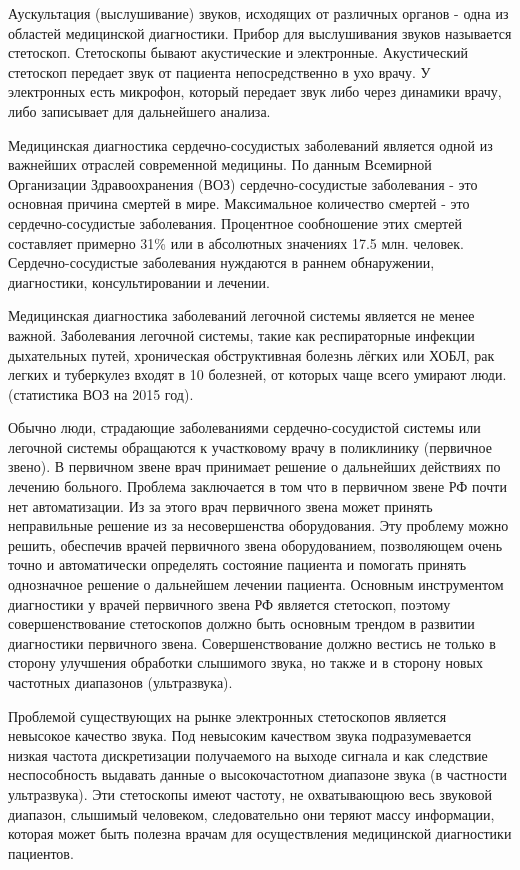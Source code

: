 \documentclass[../paper.tex]{subfiles}
\begin{document}
Аускультация (выслушивание) звуков, исходящих от различных органов - одна из областей медицинской диагностики. Прибор для выслушивания звуков называется стетоскоп. Стетоскопы бывают акустические и электронные. Акустический стетоскоп передает звук от пациента непосредственно в ухо врачу. У электронных есть микрофон, который передает звук либо через динамики врачу, либо записывает для дальнейшего анализа.

Медицинская диагностика сердечно-сосудистых заболеваний является одной из важнейших отраслей современной медицины. По данным Всемирной Организации Здравоохранения (ВОЗ) сердечно-сосудистые заболевания - это основная причина смертей в мире. Максимальное количество смертей - это сердечно-сосудистые заболевания. Процентное сообношение этих смертей составляет примерно 31\% или в абсолютных значениях  17.5 млн. человек. Сердечно-сосудистые заболевания нуждаются в раннем обнаружении, диагностики, консультировании и лечении.

Медицинская диагностика заболеваний легочной системы является не менее важной. Заболевания легочной системы, такие как респираторные инфекции дыхательных путей, хроническая обструктивная болезнь лёгких или ХОБЛ, рак легких и туберкулез входят в 10 болезней, от которых чаще всего умирают люди. (статистика ВОЗ на 2015 год).

Обычно люди, страдающие заболеваниями сердечно-сосудистой системы или легочной системы обращаются к участковому врачу в поликлинику (первичное звено). В первичном звене врач принимает решение о дальнейших действиях по лечению больного. Проблема заключается в том что в первичном звене РФ почти нет автоматизации. Из за этого врач первичного звена может принять неправильные решение из за несовершенства оборудования. Эту проблему можно решить, обеспечив врачей первичного звена оборудованием, позволяющем очень точно и автоматически определять состояние пациента и помогать принять однозначное решение о дальнейшем лечении пациента. Основным инструментом диагностики у врачей первичного звена РФ является стетоскоп, поэтому совершенствование стетоскопов должно быть основным трендом в развитии диагностики первичного звена. Совершенствование должно вестись не только в сторону улучшения обработки слышимого звука, но также и в сторону новых частотных диапазонов (ультразвука).

Проблемой существующих на рынке электронных стетоскопов является невысокое качество звука. Под невысоким качеством звука подразумевается низкая частота дискретизации получаемого на выходе сигнала и как следствие неспособность выдавать данные о высокочастотном диапазоне звука (в частности ультразвука). Эти стетоскопы имеют частоту, не охватывающюю весь звуковой диапазон, слышимый человеком, следовательно они теряют массу информации, которая может быть полезна врачам для осуществления медицинской диагностики пациентов.
\end{document}
